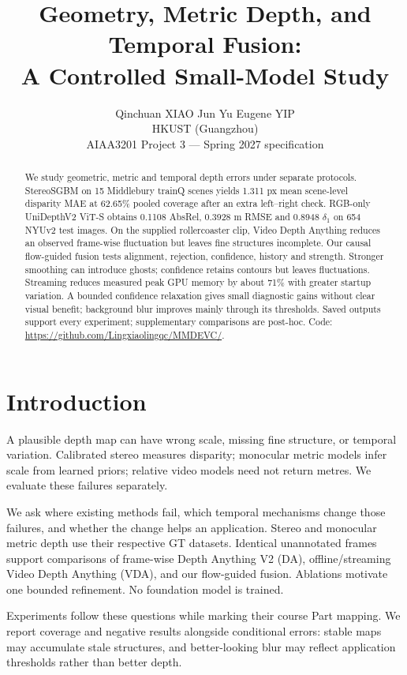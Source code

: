 \documentclass[10pt,twocolumn,letterpaper]{article}
\title{Geometry, Metric Depth, and Temporal Fusion:\\A Controlled Small-Model Study}
\author{Qinchuan XIAO \qquad Jun Yu Eugene YIP\\
HKUST (Guangzhou)\\
AIAA3201 Project 3 --- Spring 2027 specification}
\begin{document}
\maketitle
\begin{abstract}
We study geometric, metric and temporal depth errors under separate protocols. StereoSGBM on 15 Middlebury trainQ scenes yields 1.311 px mean scene-level disparity MAE at 62.65\% pooled coverage after an extra left--right check. RGB-only UniDepthV2 ViT-S obtains 0.1108 AbsRel, 0.3928 m RMSE and 0.8948 $\delta_1$ on 654 NYUv2 test images. On the supplied rollercoaster clip, Video Depth Anything reduces an observed frame-wise fluctuation but leaves fine structures incomplete. Our causal flow-guided fusion tests alignment, rejection, confidence, history and strength. Stronger smoothing can introduce ghosts; confidence retains contours but leaves fluctuations. Streaming reduces measured peak GPU memory by about 71\% with greater startup variation. A bounded confidence relaxation gives small diagnostic gains without clear visual benefit; background blur improves mainly through its thresholds. Saved outputs support every experiment; supplementary comparisons are post-hoc. Code: \url{https://github.com/Lingxiaolingqc/MMDEVC/}.
\end{abstract}

\section{Introduction}
A plausible depth map can have wrong scale, missing fine structure, or temporal variation. Calibrated stereo measures disparity; monocular metric models infer scale from learned priors; relative video models need not return metres. We evaluate these failures separately.

We ask where existing methods fail, which temporal mechanisms change those failures, and whether the change helps an application. Stereo and monocular metric depth use their respective GT datasets. Identical unannotated frames support comparisons of frame-wise Depth Anything V2 (DA), offline/streaming Video Depth Anything (VDA), and our flow-guided fusion. Ablations motivate one bounded refinement. No foundation model is trained.

Experiments follow these questions while marking their course Part mapping. We report coverage and negative results alongside conditional errors: stable maps may accumulate stale structures, and better-looking blur may reflect application thresholds rather than better depth.
\end{document}
